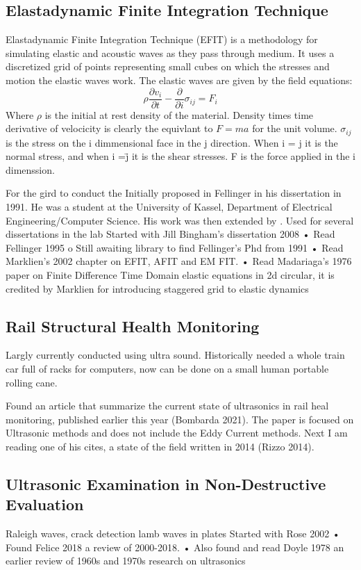 \documentclass[journal=jacsat,manuscript=article]{achemso}
\begin{document}
\subsection{Elastadynamic Finite Integration Technique}
Elastadynamic Finite Integration Technique (EFIT) is a methodology for simulating elastic and acoustic waves as they pass through medium.  It uses a discretized grid of points representing small cubes on which the stresses and motion the elastic waves work.  The elastic waves are given by the field equations:
\begin{equation}
	\rho \frac{\partial v_i}{\partial t} - \frac{\partial}{\partial i}\sigma_{ij} = F_i
\end{equation}
Where $\rho$ is the initial at rest density of the material.  Density times time derivative of velocicity is clearly the equivlant to $F=ma$ for the unit volume.  $\sigma_{ij}$ is the stress on the i dimmensional face in the j direction.  When i = j it is the normal stress, and when i =\= j it is the shear stresses.  F is the force applied in the i dimenssion. 


For the gird to conduct the 
Initially proposed in Fellinger in his dissertation in 1991.  He was a student at the University of Kassel, Department of Electrical Engineering/Computer Science.  His work was then extended by . Used for several dissertations in the lab 
Started with Jill Bingham’s dissertation 2008
•         Read Fellinger 1995
o   Still awaiting library to find Fellinger’s Phd from 1991
•         Read Marklien’s 2002 chapter on EFIT, AFIT and EM FIT.
•         Read Madariaga’s 1976 paper on Finite Difference Time Domain elastic equations in 2d circular, it is credited by Marklien for introducing staggered grid to elastic dynamics


\subsection{Rail Structural Health Monitoring}
Largly currently conducted using ultra sound. Historically needed a whole train car full of racks for computers, now can be done on a small human portable rolling cane.

Found an article that summarize the current state of ultrasonics in rail heal monitoring, published earlier this year (Bombarda 2021). The paper is focused on Ultrasonic methods and does not include the Eddy Current methods.
Next I am reading one of his cites, a state of the field written in 2014 (Rizzo 2014).  


\subsection{Ultrasonic Examination in Non-Destructive Evaluation}
Raleigh waves, crack detection lamb waves in plates 
Started with Rose 2002
•         Found Felice 2018 a review of 2000-2018.
•         Also found and read Doyle 1978 an earlier review of 1960s and 1970s research on ultrasonics
\end{document}
